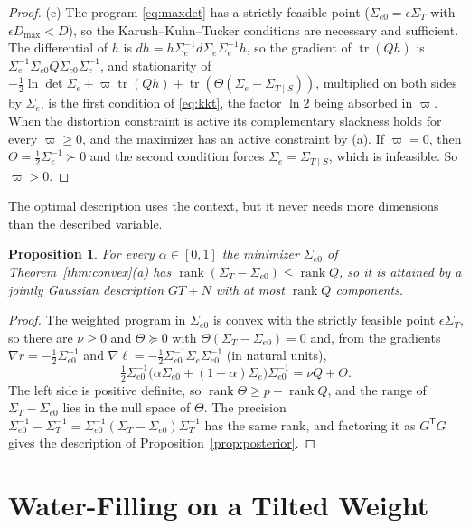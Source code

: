 \documentclass[11pt,onecolumn]{IEEEtran}
\newtheorem{proposition}[theorem]{Proposition}
\newcommand{\tr}{\operatorname{tr}}
\newcommand{\Se}{\Sigma_{e}}
\newcommand{\Sez}{\Sigma_{e0}}
\newcommand{\Kc}{\Sigma_{T\mid S}}
\begin{document}
\begin{proof}
(c) The program \eqref{eq:maxdet} has a strictly feasible point
($\Sez=\epsilon\Sigma_T$ with $\epsilon D_{\max}<D$), so the
Karush--Kuhn--Tucker conditions are necessary and sufficient. The
differential of $h$ is $dh=h\Se^{-1}d\Se\Se^{-1}h$, so the gradient of
$\tr(Qh)$ is $\Se^{-1}\Sez Q\Sez\Se^{-1}$, and stationarity of
$-\tfrac12\ln\det\Se+\varpi\tr(Qh)+\tr(\Theta(\Se-\Kc))$, multiplied on
both sides by $\Se$, is the first condition of \eqref{eq:kkt}, the factor
$\ln2$ being absorbed in $\varpi$. When the distortion constraint is
active its complementary slackness holds for every $\varpi\ge0$, and the
maximizer has an active constraint by (a). If $\varpi=0$, then
$\Theta=\tfrac12\Se^{-1}\succ0$ and the second condition forces
$\Se=\Kc$, which is infeasible. So $\varpi>0$.
\end{proof}

The optimal description uses the context, but it never needs more
dimensions than the described variable.

\begin{proposition}\label{prop:rank}
For every $\alpha\in[0,1]$ the minimizer $\Sez$ of
Theorem~\ref{thm:convex}(a) has
$\operatorname{rank}(\Sigma_T-\Sez)\le\operatorname{rank}Q$, so it is
attained by a jointly Gaussian description $GT+N$ with at most
$\operatorname{rank}Q$ components.
\end{proposition}

\begin{proof}
The weighted program in $\Sez$ is convex with the strictly feasible point
$\epsilon\Sigma_T$, so there are $\nu\ge0$ and $\Theta\succeq0$ with
$\Theta(\Sigma_T-\Sez)=0$ and, from the gradients
$\nabla r=-\tfrac12\Sez^{-1}$ and
$\nabla\ell=-\tfrac12\Sez^{-1}\Se\Sez^{-1}$ (in natural units),
\[
\tfrac12\Sez^{-1}\bigl(\alpha\Sez+(1-\alpha)\Se\bigr)\Sez^{-1}=\nu Q+\Theta .
\]
The left side is positive definite, so
$\operatorname{rank}\Theta\ge p-\operatorname{rank}Q$, and the range of
$\Sigma_T-\Sez$ lies in the null space of $\Theta$. The precision
$\Sez^{-1}-\Sigma_T^{-1}=\Sez^{-1}(\Sigma_T-\Sez)\Sigma_T^{-1}$ has the
same rank, and factoring it as $G^{\mathsf T}G$ gives the description of
Proposition~\ref{prop:posterior}.
\end{proof}

\section{Water-Filling on a Tilted Weight}
\label{sec:tilted}
\end{document}

